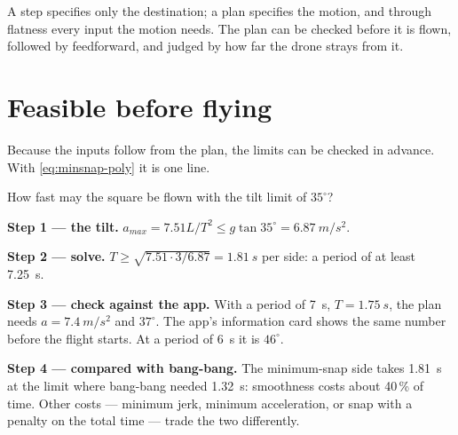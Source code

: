 \begin{keyidea}
A step specifies only the destination; a plan specifies the motion, and through flatness every input the motion needs. The plan can be checked before it is flown, followed by feedforward, and judged by how far the drone strays from it.
\end{keyidea}

\section{Feasible before flying}

Because the inputs follow from the plan, the limits can be checked in advance. With \cref{eq:minsnap-poly} it is one line.

\begin{example}
\label{ex:minsnap-feasible}
How fast may the square be flown with the tilt limit of $35^\circ$?

\textbf{Step 1 — the tilt.} $a_{max} = 7.51L/T^2 \le g\tan35^\circ = \SI{6.87}{m/s^2}$.

\textbf{Step 2 — solve.} $T \ge \sqrt{7.51 \cdot 3/6.87} = \SI{1.81}{s}$ per side: a period of at least \SI{7.25}{s}.

\textbf{Step 3 — check against the app.} With a period of \SI{7}{s}, $T = \SI{1.75}{s}$, the plan needs $a = \SI{7.4}{m/s^2}$ and $37^\circ$. The app's information card shows the same number before the flight starts. At a period of \SI{6}{s} it is $46^\circ$.

\textbf{Step 4 — compared with bang-bang.} The minimum-snap side takes \SI{1.81}{s} at the limit where bang-bang needed \SI{1.32}{s}: smoothness costs about 40\,\% of time. Other costs — minimum jerk, minimum acceleration, or snap with a penalty on the total time — trade the two differently.
\end{example}


